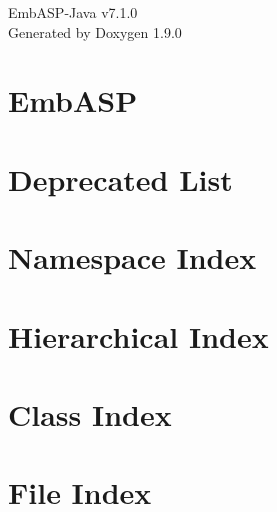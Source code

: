 \let\mypdfximage\pdfximage\def\pdfximage{\immediate\mypdfximage}\documentclass[twoside]{book}
\newcommand{\+}{\discretionary{\mbox{\scriptsize$\hookleftarrow$}}{}{}}
\newcommand{\clearemptydoublepage}{%
  \newpage{\pagestyle{empty}\cleardoublepage}%
}
\begin{document}
\raggedbottom

\hypersetup{pageanchor=false,
             bookmarksnumbered=true,
             pdfencoding=unicode
            }
\begin{titlepage}
\vspace*{7cm}
\begin{center}%
{\Large Emb\+ASP-\/\+Java v7.1.0 }\\
\vspace*{1cm}
{\large Generated by Doxygen 1.9.0}\\
\end{center}
\end{titlepage}
\clearemptydoublepage
{}
\tableofcontents
\clearemptydoublepage
{}
\hypersetup{pageanchor=true}

\chapter{Emb\+ASP}
\label{index}\hypertarget{index}{}
\chapter{Deprecated List}
\label{deprecated}

\chapter{Namespace Index}

\chapter{Hierarchical Index}

\chapter{Class Index}

\chapter{File Index}

\end{document}
